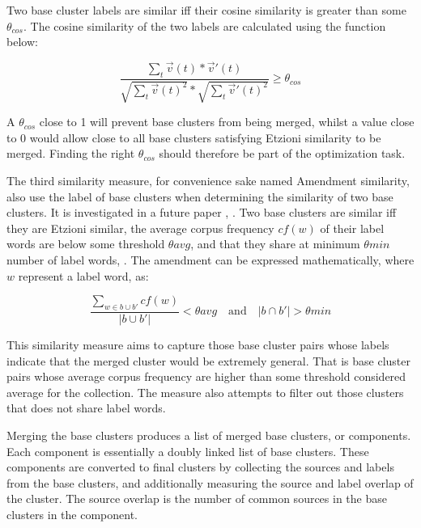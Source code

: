 Two base cluster labels are similar iff their cosine similarity is greater than some \(\theta_{cos}\). The cosine similarity of the two labels are calculated using the function below:

\begin{displaymath}
\frac{\sum_{t}\vec{v}(t) * \vec{v}'(t)}
{\sqrt{\sum_{t}\vec{v}(t)^2} * \sqrt{\sum_{t}\vec{v}'(t)^2}}
\ge \theta_{cos}
\end{displaymath}

A \(\theta_{cos}\) close to 1 will prevent base clusters from being merged, whilst a value close to 0 would allow close to all base clusters satisfying Etzioni similarity to be merged. Finding the right \(\theta_{cos}\) should therefore be part of the optimization task.

The third similarity measure, for convenience sake named Amendment similarity, also use the label of base clusters when determining the similarity of two base clusters. It is investigated in a future paper , \parencite{Moe2014future}. Two base clusters are similar iff they are Etzioni similar, the average corpus frequency \(cf(w)\) of their label words are below some threshold \(\theta avg\), and that they share at minimum \(\theta min\) number of label words, \parencite{Moe2014}. The amendment can be expressed mathematically, where \(w\) represent a label word, as:

\begin{displaymath}
\frac{\sum\limits_{w \in b \cup b'} cf(w)}{\vert b \cup b' \vert} < \theta avg \quad \text{and} \quad \vert b \cap b' \vert > \theta min
\end{displaymath}

This similarity measure aims to capture those base cluster pairs whose labels indicate that the merged cluster would be extremely general. That is base cluster pairs whose average corpus frequency are higher than some threshold considered average for the collection. The measure also attempts to filter out those clusters that does not share label words.

Merging the base clusters produces a list of merged base clusters, or components. Each component is essentially a doubly linked list of base clusters. These components are converted to final clusters by collecting the sources and labels from the base clusters, and additionally measuring the source and label overlap of the cluster. The source overlap is the number of common sources in the base clusters in the component.

